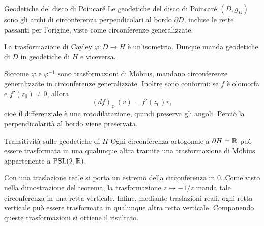 \documentclass[a4paper]{article}
\begin{document}

\begin{snippetcorollary}{Geodetiche del disco di Poincaré}
Le geodetiche del disco di Poincaré \((D,g_D)\) sono gli archi di circonferenza perpendicolari al bordo \(\partial D\), incluse le rette passanti per l'origine, viste come circonferenze generalizzate.
\end{snippetcorollary}

\begin{snippetproof}{}
La trasformazione di Cayley \(\varphi\colon D\to H\) è un'isometria. Dunque manda geodetiche di \(D\) in geodetiche di \(H\) e viceversa.

Siccome \(\varphi\) e \(\varphi^{-1}\) sono trasformazioni di M\"obius, mandano circonferenze generalizzate in circonferenze generalizzate. Inoltre sono conformi: se \(f\) è olomorfa e \(f'(z_0)\neq 0\), allora
\[
    (df)_{z_0}(v)=f'(z_0)v,
\]
cioè il differenziale è una rotodilatazione, quindi preserva gli angoli. Perciò la perpendicolarità al bordo viene preservata.
\end{snippetproof}

\begin{snippetproposition}{Transitività sulle geodetiche di \(H\)}
Ogni circonferenza ortogonale a \(\partial H=\mathbb{R}\) può essere trasformata in una qualunque altra tramite una trasformazione di M\"obius appartenente a \(\operatorname{PSL}(2,\mathbb{R})\).
\end{snippetproposition}

\begin{snippetproof}{}
Con una traslazione reale si porta un estremo della circonferenza in \(0\). Come visto nella dimostrazione del teorema, la trasformazione \(z\mapsto -1/z\) manda tale circonferenza in una retta verticale. Infine, mediante traslazioni reali, ogni retta verticale può essere trasformata in qualunque altra retta verticale. Componendo queste trasformazioni si ottiene il risultato.
\end{snippetproof}
\end{document}
